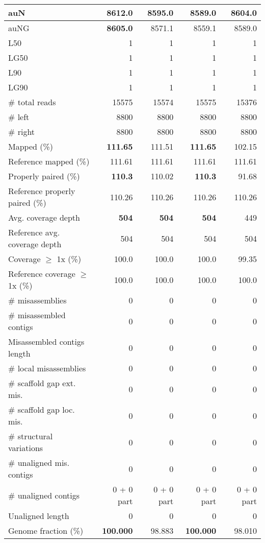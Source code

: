 \documentclass[12pt,a4paper]{article}
\begin{document}
\begin{table}[ht]
\begin{center}
\begin{tabular}{|l*{4}{|r}|}
auN & {\bf 8612.0} & 8595.0 & 8589.0 & 8604.0 \\ \hline
auNG & {\bf 8605.0} & 8571.1 & 8559.1 & 8589.0 \\ \hline
L50 & 1 & 1 & 1 & 1 \\ \hline
LG50 & 1 & 1 & 1 & 1 \\ \hline
L90 & 1 & 1 & 1 & 1 \\ \hline
LG90 & 1 & 1 & 1 & 1 \\ \hline
\# total reads & 15575 & 15574 & 15575 & 15376 \\ \hline
\# left & 8800 & 8800 & 8800 & 8800 \\ \hline
\# right & 8800 & 8800 & 8800 & 8800 \\ \hline
Mapped (\%) & {\bf 111.65} & 111.51 & {\bf 111.65} & 102.15 \\ \hline
Reference mapped (\%) & 111.61 & 111.61 & 111.61 & 111.61 \\ \hline
Properly paired (\%) & {\bf 110.3} & 110.02 & {\bf 110.3} & 91.68 \\ \hline
Reference properly paired (\%) & 110.26 & 110.26 & 110.26 & 110.26 \\ \hline
Avg. coverage depth & {\bf 504} & {\bf 504} & {\bf 504} & 449 \\ \hline
Reference avg. coverage depth & 504 & 504 & 504 & 504 \\ \hline
Coverage $\geq$ 1x (\%) & 100.0 & 100.0 & 100.0 & 99.35 \\ \hline
Reference coverage $\geq$ 1x (\%) & 100.0 & 100.0 & 100.0 & 100.0 \\ \hline
\# misassemblies & 0 & 0 & 0 & 0 \\ \hline
\# misassembled contigs & 0 & 0 & 0 & 0 \\ \hline
Misassembled contigs length & 0 & 0 & 0 & 0 \\ \hline
\# local misassemblies & 0 & 0 & 0 & 0 \\ \hline
\# scaffold gap ext. mis. & 0 & 0 & 0 & 0 \\ \hline
\# scaffold gap loc. mis. & 0 & 0 & 0 & 0 \\ \hline
\# structural variations & 0 & 0 & 0 & 0 \\ \hline
\# unaligned mis. contigs & 0 & 0 & 0 & 0 \\ \hline
\# unaligned contigs & 0 + 0 part & 0 + 0 part & 0 + 0 part & 0 + 0 part \\ \hline
Unaligned length & 0 & 0 & 0 & 0 \\ \hline
Genome fraction (\%) & {\bf 100.000} & 98.883 & {\bf 100.000} & 98.010 \\ \hline

\end{tabular}
\end{center}
\end{table}
\end{document}
